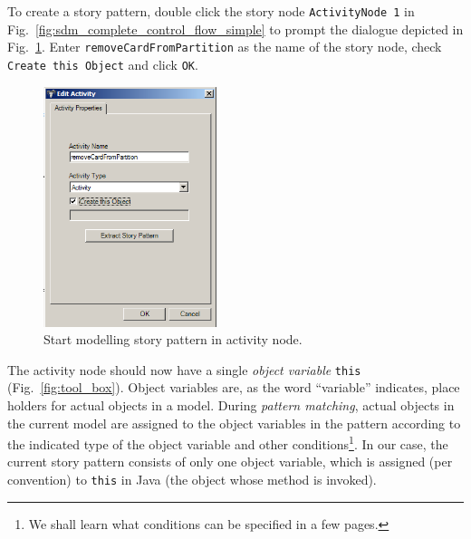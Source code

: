 To create a story pattern, double click the story node \texttt{ActivityNode 1} in Fig.~\ref{fig:sdm_complete_control_flow_simple} to prompt the dialogue depicted in Fig.~\ref{fig:story_pattern}.  
Enter \texttt{remove\-Card\-From\-Partition} as the name of the story node, check \texttt{Create this Object} and click \texttt{OK}.

\begin{figure}[htpb]
\begin{center} 
  \includegraphics[width=0.45\textwidth]{pics/sdmBilder/removeCard/sdm07RAW}
  \caption{Start modelling story pattern in activity node.}  
  \label{fig:story_pattern}
\end{center}
\end{figure}

The activity node should now have a single \emph{object variable} \texttt{this}
(Fig.~\ref{fig:tool_box}). 
Object variables are, as the word ``variable'' indicates, place holders for actual objects in a model.  
During \emph{pattern matching},
actual objects in the  current model are assigned to the object variables in the pattern according to  the indicated type of the object variable and other conditions\footnote{We shall learn what conditions can be specified in a
few pages.}. 
In our case, the current story pattern consists of only one object variable, which is assigned (per convention) to \texttt{this} in Java (the object whose method is invoked).

